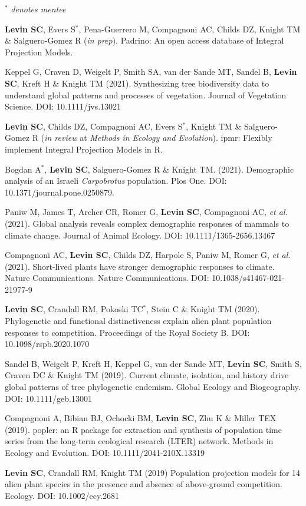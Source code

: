 \documentclass[11pt,]{article}
\begin{document}
\(^\ast\) \emph{denotes mentee}

\textbf{Levin SC}, Evers S\(^\ast\), Pena-Guerrero M, Compagnoni AC,
Childs DZ, Knight TM \& Salguero-Gomez R (\emph{in prep}). Padrino: An
open access database of Integral Projection Models.

Keppel G, Craven D, Weigelt P, Smith SA, van der Sande MT, Sandel B,
\textbf{Levin SC}, Kreft H \& Knight TM (2021). Synthesizing tree
biodiversity data to understand global patterns and processes of
vegetation. Journal of Vegetation Science. DOI: 10.1111/jvs.13021

\textbf{Levin SC}, Childs DZ, Compagnoni AC, Evers S\(^\ast\), Knight TM
\& Salguero-Gomez R (\emph{in review} at \emph{Methods in Ecology and
Evolution}). ipmr: Flexibly implement Integral Projection Models in R.

Bogdan A\(^\ast\), \textbf{Levin SC}, Salguero-Gomez R \& Knight TM.
(2021). Demographic analysis of an Israeli \emph{Carpobrotus}
population. Plos One. DOI: 10.1371/journal.pone.0250879.

Paniw M, James T, Archer CR, Romer G, \textbf{Levin SC}, Compagnoni AC,
\emph{et al.} (2021). Global analysis reveals complex demographic
responses of mammals to climate change. Journal of Animal Ecology. DOI:
10.1111/1365-2656.13467

Compagnoni AC, \textbf{Levin SC}, Childs DZ, Harpole S, Paniw M, Romer
G, \emph{et al.} (2021). Short-lived plants have stronger demographic
responses to climate. Nature Communications. Nature Communications. DOI:
10.1038/s41467-021-21977-9

\textbf{Levin SC}, Crandall RM, Pokoski TC\(^\ast\), Stein C \& Knight
TM (2020). Phylogenetic and functional distinctiveness explain alien
plant population responses to competition. Proceedings of the Royal
Society B. DOI: 10.1098/rspb.2020.1070

Sandel B, Weigelt P, Kreft H, Keppel G, van der Sande MT, \textbf{Levin
SC}, Smith S, Craven DC \& Knight TM (2019). Current climate, isolation,
and history drive global patterns of tree phylogenetic endemism. Global
Ecology and Biogeography. DOI: 10.1111/geb.13001

Compagnoni A, Bibian BJ, Ochocki BM, \textbf{Levin SC}, Zhu K \& Miller
TEX (2019). popler: an R package for extraction and synthesis of
population time series from the long-term ecological research (LTER)
network. Methods in Ecology and Evolution. DOI: 10.1111/2041-210X.13319

\textbf{Levin SC}, Crandall RM, Knight TM (2019) Population projection
models for 14 alien plant species in the presence and absence of
above‐ground competition. Ecology. DOI: 10.1002/ecy.2681
\end{document}
